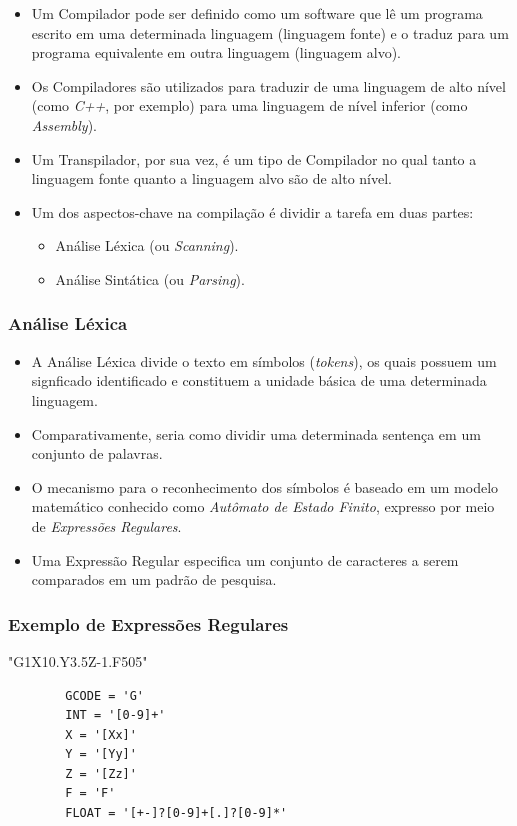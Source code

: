 \documentclass[aspectratio=169]{beamer}
\begin{document}
{\begin{frame}
  \begin{itemize}
    \item Um Compilador pode ser definido como um software que lê um 
          programa escrito em uma determinada linguagem (linguagem fonte) 
          e o traduz para um programa equivalente em outra linguagem 
          (linguagem alvo).
    \item Os Compiladores são utilizados para traduzir de uma linguagem 
          de alto nível (como \emph{C++}, por exemplo) para uma linguagem 
          de nível inferior (como \emph{Assembly}).
    \item Um Transpilador, por sua vez, é um tipo de Compilador no qual 
          tanto a linguagem fonte quanto a linguagem alvo são de alto 
          nível.
    \item Um dos aspectos-chave na compilação é dividir a tarefa em duas 
          partes:
          \begin{itemize}
            \item Análise Léxica (ou \emph{Scanning}).
            \item Análise Sintática (ou \emph{Parsing}).
          \end{itemize}
  \end{itemize} 

\end{frame}


\begin{frame}
  \frametitle{Análise Léxica}
  \begin{itemize}
    \item A Análise Léxica divide o texto em símbolos (\emph{tokens}),
          os quais possuem um signficado identificado e constituem a 
          unidade básica de uma determinada linguagem.
    \item Comparativamente, seria como dividir uma determinada sentença 
          em um conjunto de palavras.
    \item O mecanismo para o reconhecimento dos símbolos é baseado em 
          um modelo matemático conhecido como \emph{Autômato de Estado 
          Finito}, expresso por meio de \emph{Expressões Regulares}.
    \item Uma Express\~ao Regular especifica um conjunto de caracteres 
          a serem comparados em um padr\~ao de pesquisa.
  \end{itemize}  

\end{frame}


\begin{frame}[fragile]
  \frametitle{Exemplo de Expressões Regulares}
  \begin{example}
      "G1X10.Y3.5Z-1.F505"
      \begin{lstlisting}
        GCODE = 'G'        
        INT = '[0-9]+'
        X = '[Xx]'
        Y = '[Yy]'
        Z = '[Zz]'
        F = 'F'
        FLOAT = '[+-]?[0-9]+[.]?[0-9]*'
      \end{lstlisting}
    \end{example}
  \end{frame}


}
\end{document}
